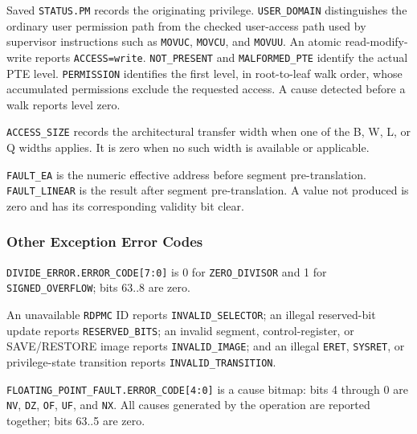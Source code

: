 

Saved \texttt{STATUS.PM} records the originating privilege. \texttt{USER\_DOMAIN} distinguishes the ordinary user
permission path from the checked user-access path used
by supervisor instructions such as \texttt{MOVUC}, \texttt{MOVCU}, and \texttt{MOVUU}. An atomic read-modify-write
reports \texttt{ACCESS=write}. \texttt{NOT\_PRESENT} and \texttt{MALFORMED\_PTE} identify the actual PTE level.
\texttt{PERMISSION} identifies the first level, in root-to-leaf walk order, whose accumulated permissions exclude the
requested access. A cause detected before a walk reports level zero.

\texttt{ACCESS\_SIZE} records the architectural transfer width when one of the B, W, L, or Q widths applies. It is
zero when no such width is available or applicable.

\texttt{FAULT\_EA} is the numeric effective address before segment pre-translation. \texttt{FAULT\_LINEAR} is the
result after segment pre-translation. A value not produced is zero and has its corresponding validity bit clear.

\subsubsection{Other Exception Error Codes}
\texttt{DIVIDE\_ERROR.ERROR\_CODE[7:0]} is 0 for \texttt{ZERO\_DIVISOR} and 1 for
\texttt{SIGNED\_OVERFLOW}; bits 63..8 are zero.





An unavailable \texttt{RDPMC} ID reports \texttt{INVALID\_SELECTOR}; an illegal
reserved-bit update reports \texttt{RESERVED\_BITS}; an invalid segment,
control-register, or SAVE/RESTORE image reports \texttt{INVALID\_IMAGE}; and an
illegal \texttt{ERET}, \texttt{SYSRET}, or privilege-state transition reports
\texttt{INVALID\_TRANSITION}.

\texttt{FLOATING\_POINT\_FAULT.ERROR\_CODE[4:0]} is a cause bitmap: bits 4 through 0 are \texttt{NV},
\texttt{DZ}, \texttt{OF}, \texttt{UF}, and \texttt{NX}. All causes generated by the operation are reported together;
bits 63..5 are zero.

